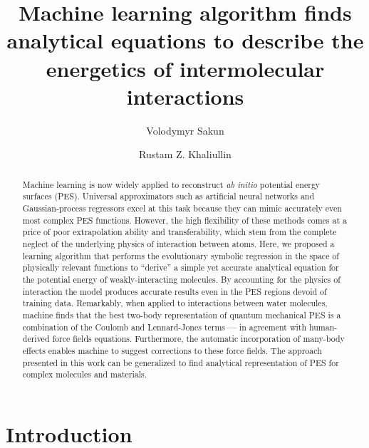 \documentclass[aip,jcp,reprint,amsmath,amssymb,nature]{revtex4-1}
\begin{document}
\title{Machine learning algorithm finds analytical equations to describe the energetics of intermolecular interactions}

\author{Volodymyr Sakun}
\author{Rustam Z. Khaliullin}


\begin{abstract}
Machine learning is now widely applied to reconstruct \emph{ab initio} potential energy surfaces (PES). 
Universal approximators such as artificial neural networks and Gaussian-process regressors excel at this task because they can mimic accurately even most complex PES functions.
However, the high flexibility of these methods comes at a price of poor extrapolation ability and transferability, which stem from the complete neglect of the underlying physics of interaction between atoms. 
Here, we proposed a learning algorithm that performs the evolutionary symbolic regression in the space of physically relevant functions to ``derive'' a simple yet accurate analytical equation for the potential energy of weakly-interacting molecules. 
By accounting for the physics of interaction the model produces accurate results even in the PES regions devoid of training data.
Remarkably, when applied to interactions between water molecules, machine finds that the best two-body representation of quantum mechanical PES is a combination of the Coulomb and Lennard-Jones terms --- in agreement with human-derived force fields equations.  
Furthermore, the automatic incorporation of many-body effects enables machine to suggest corrections to these force fields. 
The approach presented in this work can be generalized to find analytical representation of PES for complex molecules and materials.
\end{abstract}

\maketitle

\section{Introduction}
\end{document}
